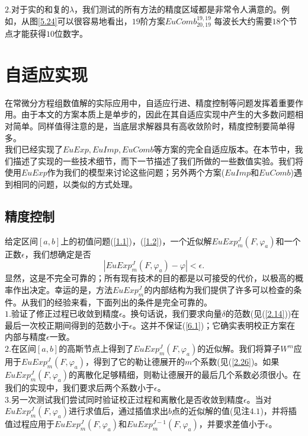 \documentclass[12pt,a4paper]{article}
\begin{document}
$2$.对于实的和复的$\lambda$，我们测试的所有方法的精度区域都是非常令人满意的。例如，从图\ref{5.24}可以很容易地看出，$19$阶方案$EuComb^{19,19}_{20,19}$ 每波长大约需要$18$个节点才能获得$10$位数字。\\
\section{自适应实现}

在常微分方程组数值解的实际应用中，自适应行进、精度控制等问题发挥着重要作用。由于本文的方案本质上是单步的，因此在其自适应实现中产生的大多数问题相对简单。同样值得注意的是，当底层求解器具有高收敛阶时，精度控制要简单得多。\\

我们已经实现了$EuExp,EuImp,EuComb$等方案的完全自适应版本。在本节中，我们描述了实现的一些技术细节，而下一节描述了我们所做的一些数值实验。我们将使用$EuExp$作为我们的模型来讨论这些问题；另外两个方案($EuImp$和$EuComb$)遇到相同的问题，以类似的方式处理。\\
\subsection{精度控制}

给定区间$[a,b]$上的初值问题(\ref{1.1})，(\ref{1.2})，一个近似解$EuExp^J_m(F,\varphi_a)$和一个正数$\epsilon$，我们想确定是否\\
\begin{equation}
\label{6.1}
|EuExp^J_m(F,\varphi_a)-\varphi|<\epsilon.
\end{equation}
显然，这是不完全可靠的；所有现有技术的目的都是以可接受的代价，以极高的概率作出决定。幸运的是，方法$EuExp^J_m$的内部结构为我们提供了许多可以检查的条件。从我们的经验来看，下面列出的条件是完全可靠的。\\

$1$.验证了修正过程已收敛到精度$\epsilon$。换句话说，我们要求向量$\delta$的范数(见(\ref{2.14}))在最后一次校正期间得到的范数小于$\epsilon$。这并不保证(\ref{6.1})；它确实表明校正方案在内部与精度$\epsilon$一致。\\

$2$.在区间$[a,b]$的高斯节点上得到了$EuExp^J_m(F,\varphi_a)$的近似解。我们将算子$W^m$应用于$EuExp^J_m(F,\varphi_a)$，得到了它的勒让德展开的$m$个系数(见(\ref{2.26})。如果$EuExp^J_m(F,\varphi_a)$的离散化足够精细，则勒让德展开的最后几个系数必须很小。在我们的实现中，我们要求后两个系数小于$\epsilon$。\\

$3$.另一次测试我们尝试同时验证校正过程和离散化是否收敛到精度$\epsilon$。当对$EuExp^J_m(F,\varphi_a)$进行求值后，通过插值求出$b$点的近似解的值(见注$4.1$)，并将插值过程应用于$EuExp^J_m(F,\varphi_a)$和$EuExp^{J-1}_m(F,\varphi_a)$，并要求差值小于$\epsilon$。\\
\end{document}
